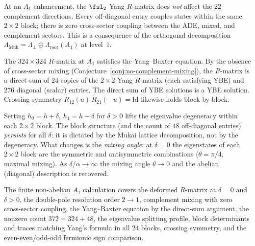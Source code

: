 \begin{conjecture}
\label{conj:no-complement-mixing}
\ClaimStatusConjectured
At an $A_1$ enhancement, the $\fsl_2$ Yang $R$-matrix does
\emph{not} affect the $22$ complement directions. Every
off-diagonal entry couples states within the same $2 \times 2$
block; there is zero cross-sector coupling between the ADE,
mixed, and complement sectors. This is a consequence of the
orthogonal decomposition
$\Lambda_{\mathrm{Muk}} = \Lambda_{\perp} \oplus \Lambda_{\mathrm{root}}(A_1)$
at level~$1$.
\end{conjecture}

\begin{conjecture}
\label{conj:ybe-block-rmatrix}
\ClaimStatusConjectured
The $324 \times 324$ $R$-matrix at $A_1$ satisfies the
Yang--Baxter equation. By the absence of cross-sector mixing
\textup{(}Conjecture~\textup{\ref{conj:no-complement-mixing})},
the $R$-matrix is a direct sum of $24$ copies of the $2 \times 2$
Yang $R$-matrix \textup{(}each satisfying YBE\textup{)} and
$276$ diagonal \textup{(}scalar\textup{)} entries. The direct
sum of YBE solutions is a YBE solution.
Crossing symmetry $R_{12}(u)\, R_{21}(-u) = \mathrm{Id}$ likewise
holds block-by-block.
\end{conjecture}

\begin{remark}
\label{rem:deformation-away-a1}
Setting $h_0 = h + \delta$, $h_1 = h - \delta$ for $\delta > 0$
lifts the eigenvalue degeneracy within each $2 \times 2$ block.
The block structure (and the count of $48$ off-diagonal
entries) \emph{persists} for all $\delta$: it is dictated by the
Mukai lattice decomposition, not by the degeneracy.
What changes is the \emph{mixing angle}: at $\delta = 0$
the eigenstates of each $2 \times 2$ block are the symmetric
and antisymmetric combinations ($\theta = \pi/4$, maximal mixing).
As $\delta / \alpha \to \infty$ the mixing angle $\theta \to 0$
and the abelian (diagonal) description is recovered.
\end{remark}

The finite non-abelian $A_1$ calculation covers the deformed
$R$-matrix at $\delta=0$ and $\delta>0$, the double-pole resolution
$\mathrm{order}\;2\to1$, complement mixing with zero cross-sector
coupling, the Yang--Baxter equation by the direct-sum argument, the
nonzero count $372=324+48$, the eigenvalue splitting profile, block
determinants and traces matching Yang's formula in all $24$ blocks,
crossing symmetry, and the even-even/odd-odd fermionic sign comparison.


